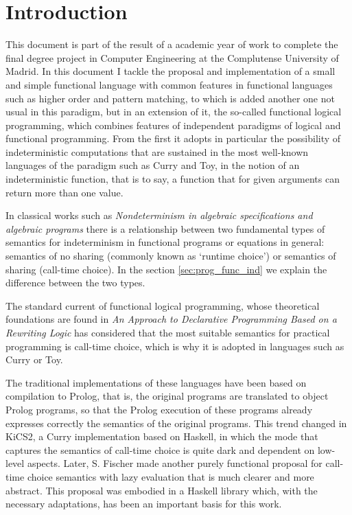 \documentclass[class=article, crop=false]{standalone}
\begin{document}
\section{Introduction}

This document is part of the result of a academic year of work to complete the final degree
project in Computer Engineering at the Complutense University of Madrid. In this document I
tackle the proposal and implementation of a small and simple functional language with common
features in functional languages such as higher order and pattern matching, to which is added
another one not usual in this paradigm, but in an extension of it, the so-called functional
logical programming\cite{antoy2010functional}, which combines features of independent
paradigms of logical and functional programming. From the first it adopts in particular the
possibility of indeterministic computations that are sustained in the most well-known
languages of the paradigm such as Curry\cite{Hanus16Curry} and Toy\cite{fraguas1999toy}, in
the notion of an indeterministic function, that is to say, a function that for given
arguments can return more than one value.

In classical works such as \textit{Nondeterminism in algebraic specifications and algebraic
programs}\cite{hussmann1993nondeterminism} there is a relationship between two fundamental
types of semantics for indeterminism in functional programs or equations in general:
semantics of no sharing (commonly known as `runtime choice') or semantics of sharing
(call-time choice). In the section \ref{sec:prog_func_ind} we explain the difference between
the two types.

The standard current of functional logical programming, whose theoretical foundations are
found in \textit{An Approach to Declarative Programming Based on a Rewriting Logic}\cite{
DBLP:journals/jlp/Gonzalez-MorenoHLR99} has considered that the most suitable semantics for
practical programming is call-time choice, which is why it is adopted in languages such as
Curry or Toy.

The traditional implementations of these languages have been based on compilation to Prolog,
that is, the original programs are translated to object Prolog programs, so that the Prolog
execution of these programs already expresses correctly the semantics of the original
programs. This trend changed in KiCS2\cite{BrasselHanusPeemoellerReck11}, a Curry
implementation based on Haskell, in which the mode that captures the semantics of call-time
choice is quite dark and dependent on low-level aspects. Later, S. Fischer made another
purely functional proposal for call-time choice semantics with lazy
evaluation\cite{fischer2011purely} that is much clearer and more abstract. This proposal was
embodied in a Haskell library which, with the necessary adaptations, has been an important
basis for this work.
\end{document}
